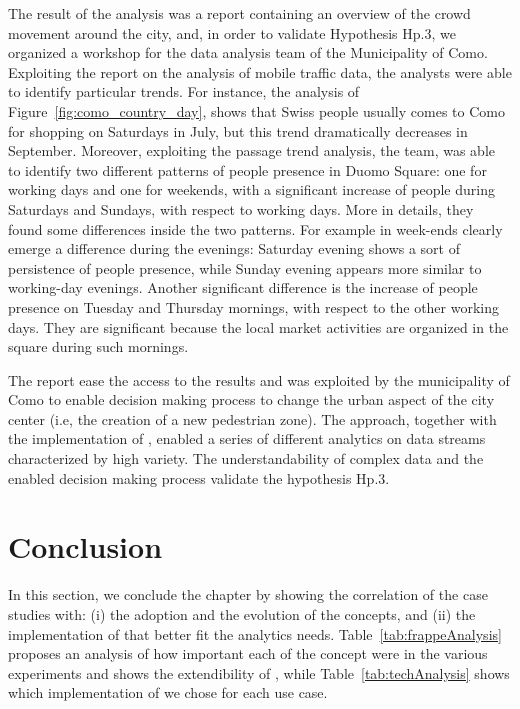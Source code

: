 {The result of the analysis was a report containing an overview of the crowd movement around the city, and, in order to validate Hypothesis \textsf{Hp.3}, we organized a workshop for the data analysis team of the Municipality of Como.
Exploiting the report on the analysis of mobile traffic data, the analysts were able to identify particular trends. For instance, the analysis of Figure~\ref{fig:como_country_day}, shows that Swiss people usually comes to Como for shopping on Saturdays in July, but this trend dramatically decreases in September.
Moreover, exploiting the passage trend analysis, the team, was able to identify two different patterns of people presence in Duomo Square: one for working days and one for weekends, with a significant increase of people during Saturdays and Sundays, with respect to working days.
More in details, they found some differences inside the two patterns. For example in week-ends clearly emerge a difference during the evenings: Saturday evening shows a sort of persistence of people presence, while Sunday evening appears more similar to working-day evenings. Another significant difference is the increase of people presence on Tuesday and Thursday mornings, with respect to the other working days. They are significant because the local market activities are organized in the square during such mornings.

The report ease the access to the results and was exploited by the municipality of Como to enable decision making process to change the urban aspect of the city center (i.e,  the creation of a new pedestrian zone).
The \frappe{} approach, together with the \sparkdi{} implementation of \river{}, enabled a series of different analytics on data streams characterized by high variety.
The understandability of complex data and the enabled decision making process validate the hypothesis \textsf{Hp.3}.

}

\section{Conclusion} \label{sec:cs-conclusion}
In this section, we conclude the chapter by showing the correlation of the case studies with: (i) the adoption and the evolution of the \frappe{} concepts, and (ii) the implementation of \river{} that better fit the analytics needs.
Table~\ref{tab:frappeAnalysis} proposes an analysis of how important each of the \frappe{} concept were in the various experiments and shows the extendibility of \frappe{}, while Table~\ref{tab:techAnalysis} shows which implementation of \river{} we chose for each use case. 

